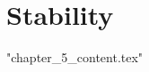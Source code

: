 %

\let\textcircled=\pgftextcircled
\chapter{Stability}
\label{chap:stability}

{"chapter_5_content.tex"}


%

